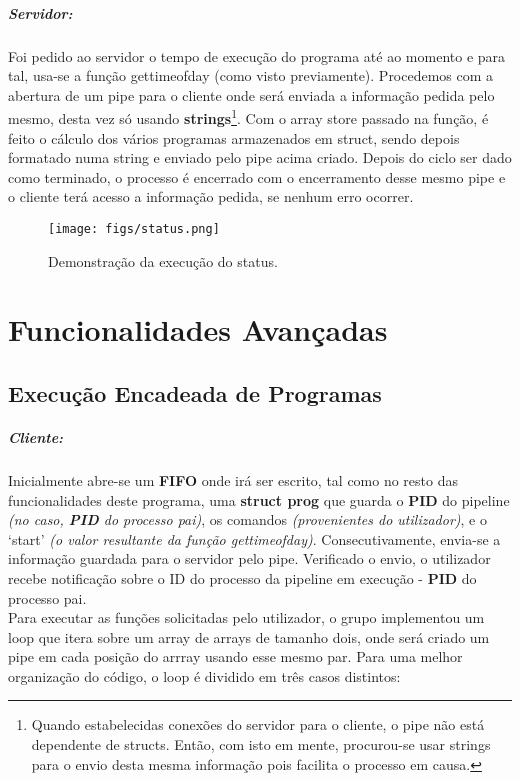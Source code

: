 \documentclass{report}
\begin{document}
\subparagraph{Servidor:}

Foi pedido ao servidor o tempo de execução do programa até ao momento e para tal, usa-se a função gettimeofday (como visto previamente). Procedemos com a abertura de um pipe para o cliente onde será enviada a informação pedida pelo mesmo, desta vez só usando \textbf{strings}\footnote{Quando estabelecidas conexões do servidor para o cliente, o pipe não está dependente de structs. Então, com isto em mente, procurou-se usar strings para o envio desta mesma informação pois facilita o processo em causa.}.
Com o array store passado na função, é feito o cálculo dos vários programas armazenados em struct, sendo depois formatado numa string e enviado pelo pipe acima criado. Depois do ciclo ser dado como terminado, o processo é encerrado com o encerramento desse mesmo pipe e o cliente terá acesso a informação pedida, se nenhum erro ocorrer.\\

\begin{figure}[h]
    \centering
    \texttt{[image: figs/status.png]}
    \caption{Demonstração da execução do status.}
    \label{f}
\end{figure}

\section{Funcionalidades Avançadas}
\subsection{Execução Encadeada de Programas}

\subparagraph{Cliente:} Inicialmente abre-se um \textbf{FIFO} onde irá ser escrito, tal como no resto das funcionalidades deste programa, uma \textbf{struct prog} que guarda o \textbf{PID} do pipeline \textit{(no caso, \textbf{PID} do processo pai)}, os comandos \textit{(provenientes do utilizador)}, e o ‘start’ \textit{(o valor resultante da função gettimeofday)}. Consecutivamente, envia-se a informação guardada para o servidor pelo pipe. Verificado o envio, o utilizador recebe notificação sobre o ID do processo da pipeline em execução - \textbf{PID} do processo pai.\\

Para executar as funções solicitadas pelo utilizador, o grupo implementou um loop que itera sobre um array de arrays de tamanho dois, onde será criado um pipe em cada posição do arrray usando esse mesmo par. Para uma melhor organização do código, o loop é dividido em três casos distintos:
\end{document}
